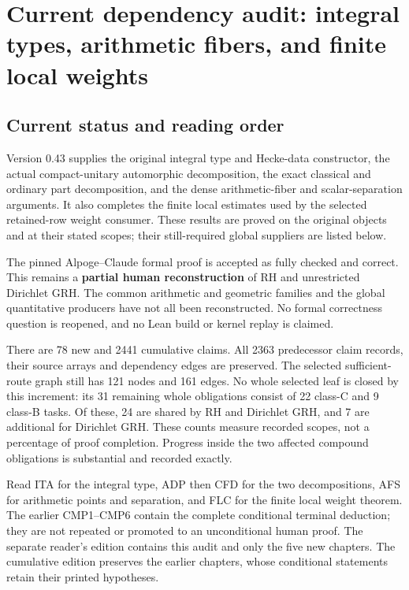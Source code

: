\section{Current dependency audit: integral types, arithmetic fibers, and finite local weights}
\label{sec:dependency-audit-v43}

\subsection{Current status and reading order}

Version 0.43 supplies the original integral type and Hecke-data
constructor, the actual compact-unitary automorphic decomposition,
the exact classical and ordinary part decomposition, and the dense
arithmetic-fiber and scalar-separation arguments. It also completes
the finite local estimates used by the selected retained-row weight
consumer. These results are proved on the original objects and at
their stated scopes; their still-required global suppliers are listed
below.

The pinned Alpoge--Claude formal proof is accepted as fully checked
and correct. This remains a \textbf{partial human reconstruction} of
RH and unrestricted Dirichlet GRH. The common arithmetic and geometric
families and the global quantitative producers have not all been
reconstructed. No formal correctness question is reopened, and no
Lean build or kernel replay is claimed.

There are 78 new and 2441 cumulative claims. All 2363 predecessor
claim records, their source arrays and dependency edges are preserved.
The selected sufficient-route graph still has 121 nodes and 161 edges.
No whole selected leaf is closed by this increment: its 31 remaining
whole obligations consist of 22 class-C and 9 class-B tasks. Of these,
24 are shared by RH and Dirichlet GRH, and 7 are additional for Dirichlet
GRH. These counts measure recorded scopes, not a percentage of proof
completion. Progress inside the two affected compound obligations is
substantial and recorded exactly.

Read ITA for the integral type, ADP then CFD for the two decompositions,
AFS for arithmetic points and separation, and FLC for the finite local
weight theorem. The earlier CMP1--CMP6 contain the complete conditional
terminal deduction; they are not repeated or promoted to an unconditional
human proof. The separate reader's edition contains this audit and only
the five new chapters. The cumulative edition preserves the earlier
chapters, whose conditional statements retain their printed hypotheses.

